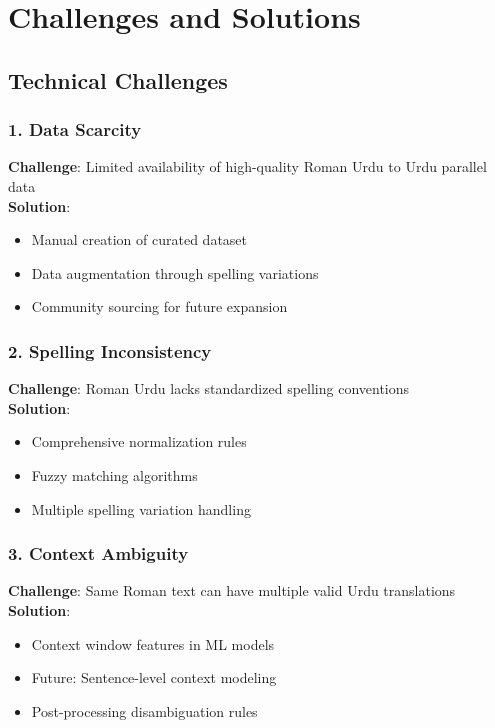 \documentclass[10pt,twocolumn]{article}
\begin{document}
\section{Challenges and Solutions}

\subsection{Technical Challenges}

\subsubsection*{1. Data Scarcity}
\textbf{Challenge}: Limited availability of high-quality Roman Urdu to Urdu parallel data\\
\textbf{Solution}:
\begin{itemize}[leftmargin=*,noitemsep,topsep=0pt,parsep=0pt,partopsep=0pt]
    \item Manual creation of curated dataset
    \item Data augmentation through spelling variations
    \item Community sourcing for future expansion
\end{itemize}

\subsubsection*{2. Spelling Inconsistency}
\textbf{Challenge}: Roman Urdu lacks standardized spelling conventions\\
\textbf{Solution}:
\begin{itemize}[leftmargin=*,noitemsep,topsep=0pt,parsep=0pt,partopsep=0pt]
    \item Comprehensive normalization rules
    \item Fuzzy matching algorithms
    \item Multiple spelling variation handling
\end{itemize}

\subsubsection*{3. Context Ambiguity}
\textbf{Challenge}: Same Roman text can have multiple valid Urdu translations\\
\textbf{Solution}:
\begin{itemize}[leftmargin=*,noitemsep,topsep=0pt,parsep=0pt,partopsep=0pt]
    \item Context window features in ML models
    \item Future: Sentence-level context modeling
    \item Post-processing disambiguation rules
\end{itemize}
\end{document}
